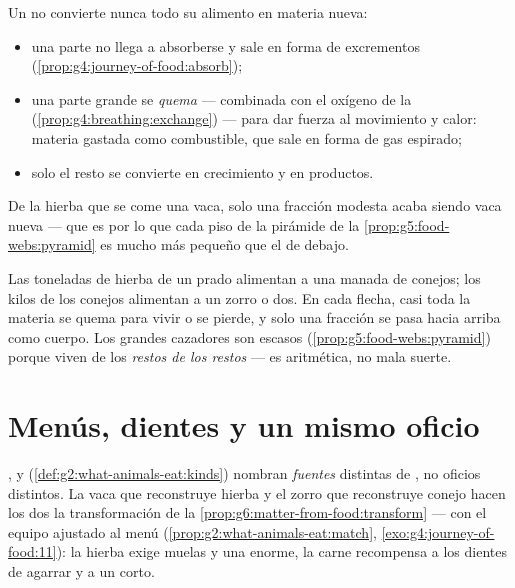 \begin{proposition}\label{prop:g6:matter-from-food:losses}
Un  no convierte nunca todo su alimento en materia nueva:
\begin{itemize}
  \item una parte no llega a absorberse y sale en forma de excrementos
        (\cref{prop:g4:journey-of-food:absorb});
  \item una parte grande se \emph{quema} --- combinada con el oxígeno
        de la  (\cref{prop:g4:breathing:exchange}) --- para
        dar fuerza al movimiento y calor: materia gastada como
        combustible, que sale en forma de gas espirado;
  \item solo el resto se convierte en crecimiento y en productos.
\end{itemize}
De la hierba que se come una vaca, solo una fracción modesta acaba
siendo vaca nueva --- que es por lo que cada piso de la pirámide de la
\cref{prop:g5:food-webs:pyramid} es mucho más pequeño que el de debajo.
\end{proposition}
\admitted

\begin{example}\label{ex:g6:matter-from-food:pyramid}
Las toneladas de hierba de un prado alimentan a una manada de conejos;
los kilos de los conejos alimentan a un zorro o dos. En cada flecha,
casi toda la materia se quema para vivir o se pierde, y solo una
fracción se pasa hacia arriba como cuerpo. Los grandes cazadores son
escasos (\cref{prop:g5:food-webs:pyramid}) porque viven de los
\emph{restos de los restos} --- es aritmética, no mala suerte.
\end{example}

\section{Menús, dientes y un mismo oficio}

\begin{proposition}\label{prop:g6:matter-from-food:menus}
,  y  (\cref{def:g2:what-animals-eat:kinds})
nombran \emph{fuentes} distintas de , no oficios
distintos. La vaca que reconstruye hierba y el zorro que reconstruye
conejo hacen los dos la transformación de la
\cref{prop:g6:matter-from-food:transform} --- con el equipo ajustado al
menú (\cref{prop:g2:what-animals-eat:match},
\cref{exo:g4:journey-of-food:11}): la hierba exige muelas y una
 enorme, la carne recompensa a los dientes de agarrar y a un
 corto.
\end{proposition}
\admitted

